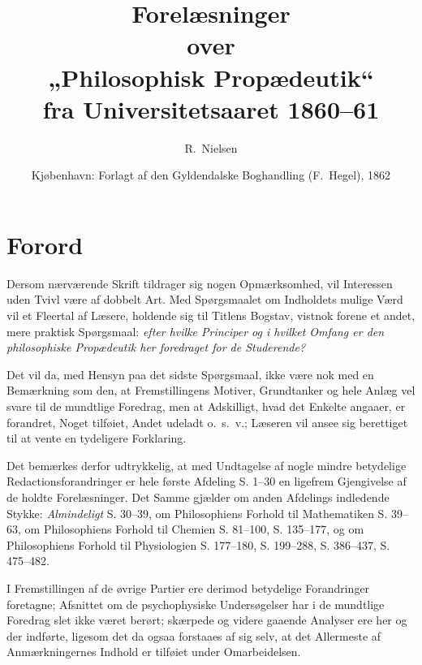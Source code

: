 \documentclass[12pt,a4paper]{book}
\title{\textbf{Forelæsninger}\\[4pt]
  \large over\\[4pt]
  \textbf{\large „Philosophisk Propædeutik“}\\[6pt]
  \large fra Universitetsaaret 1860--61}
\author{R.\ Nielsen}
\date{Kjøbenhavn: Forlagt af den Gyldendalske Boghandling (F.\ Hegel), 1862}
\begin{document}
\maketitle
\thispagestyle{empty}
\newpage

\tableofcontents
\newpage

\chapter*{Forord}
\label{ch:forord}

Dersom nærværende Skrift tildrager sig nogen Opmærksomhed, vil
Interessen uden Tvivl være af dobbelt Art. Med Spørgsmaalet om
Indholdets mulige Værd vil et Fleertal af Læsere, holdende sig til
Titlens Bogstav, vistnok forene et andet, mere praktisk Spørgsmaal:
\emph{efter hvilke Principer og i hvilket Omfang er den philosophiske
Propædeutik her foredraget for de Studerende?}

Det vil da, med Hensyn paa det sidste Spørgsmaal, ikke være nok med
en Bemærkning som den, at Fremstillingens Motiver, Grundtanker og
hele Anlæg vel svare til de mundtlige Foredrag, men at Adskilligt,
hvad det Enkelte angaaer, er forandret, Noget tilføiet, Andet udeladt
o.~s.~v.; Læseren vil ansee sig berettiget til at vente en tydeligere
Forklaring.

Det bemærkes derfor udtrykkelig, at med Undtagelse af nogle mindre
betydelige Redactionsforandringer er hele første Afdeling S. 1--30 en
ligefrem Gjengivelse af de holdte Forelæsninger. Det Samme gjælder om
anden Afdelings indledende Stykke: \emph{Almindeligt} S. 30--39, om
Philosophiens Forhold til Mathematiken S. 39--63, om Philosophiens
Forhold til Chemien S. 81--100, S. 135--177,
og om Philosophiens Forhold til Physiologien S. 177--180, S. 199--288,
S. 386--437, S. 475--482.

I Fremstillingen af de øvrige Partier ere derimod betydelige
Forandringer foretagne; Afsnittet om de psychophysiske Undersøgelser
har i de mundtlige Foredrag slet ikke været berørt; skærpede og videre
gaaende Analyser ere her og der indførte, ligesom det da ogsaa
forstaaes af sig selv, at det Allermeste af Anmærkningernes Indhold er
tilføiet under Omarbeidelsen.
\end{document}
